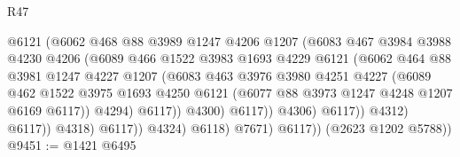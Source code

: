 \begin{lexlean}{R47}
\begin{coremodule}
                                    @6121
                                    (@6062
                                      @468
                                      @88
                                      @3989
                                      @1247
                                      @4206
                                      @1207
                                      (@6083
                                        @467
                                        @3984
                                        @3988
                                        @4230
                                        @4206
                                        (@6089
                                          @466
                                          @1522
                                          @3983
                                          @1693
                                          @4229
                                          @6121
                                          (@6062
                                            @464
                                            @88
                                            @3981
                                            @1247
                                            @4227
                                            @1207
                                            (@6083
                                              @463
                                              @3976
                                              @3980
                                              @4251
                                              @4227
                                              (@6089
                                                @462
                                                @1522
                                                @3975
                                                @1693
                                                @4250
                                                @6121
                                                (@6077 @88 @3973 @1247 @4248 @1207 @6169 @6117))
                                              @4294)
                                            @6117))
                                        @4300)
                                      @6117))
                                  @4306)
                                @6117))
                            @4312)
                          @6117))
                      @4318)
                    @6117))
                @4324)
              @6118)
            @7671)
          @6117))
      (@2623 @1202 @5788))
@9451 := @1421 @6495

\end{coremodule}
\end{lexlean}
